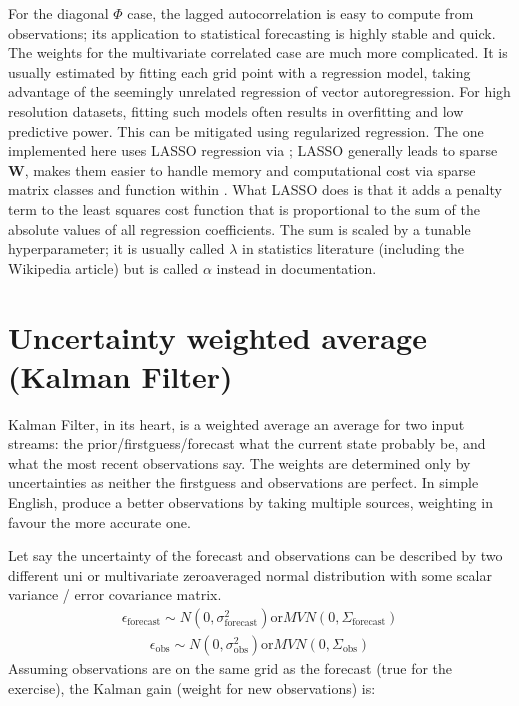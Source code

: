 \documentclass[letterpaper,10pt,english]{sphinxmanual}
\begin{document}
\sphinxAtStartPar
For the diagonal \(\Phi\) case, the lagged autocorrelation is easy to compute from observations; its application
to statistical forecasting is highly stable and quick. The weights for the multi\sphinxhyphen{}variate correlated case are
much more complicated. It is usually estimated by fitting each grid point with a regression model, taking advantage of
the seemingly unrelated regression of vector autoregression. For high resolution
datasets, fitting such models often results in overfitting and low predictive power. This can be mitigated using
regularized regression. The one implemented here uses LASSO regression  via ;
LASSO generally leads to sparse \(\mathbf{W}\), makes them easier to handle memory and computational cost via
sparse matrix classes and function within . What LASSO does is that it adds a penalty term to the least squares cost
function that is proportional to the sum of the absolute values of all regression coefficients. The
sum is scaled by a tunable hyperparameter; it is usually called \(\lambda\) in statistics literature (including the Wikipedia
article) but is called \(\alpha\) instead in  documentation.


\section{Uncertainty weighted average (Kalman Filter)}
\label{\detokenize{kalman:uncertainty-weighted-average-kalman-filter}}
\sphinxAtStartPar
Kalman Filter, in its heart, is a weighted average \textendash{} an average for two input streams: the
prior/first\sphinxhyphen{}guess/forecast what the current state probably be, and what the most recent observations
say. The weights are determined only by uncertainties as neither the first\sphinxhyphen{}guess and observations
are perfect. In simple English, produce a better observations by taking multiple sources, weighting
in favour the more accurate one.

\sphinxAtStartPar
Let say the uncertainty of the forecast and observations can be described by two different uni\sphinxhyphen{} or
multi\sphinxhyphen{}variate zero\sphinxhyphen{}averaged normal distribution with some scalar variance / error covariance matrix.
\begin{equation*}
\begin{split}\epsilon_{\text{forecast}} \sim N(0, \sigma_{\text{forecast}}^2) \text{or} MVN(0,
\Sigma_{\text{forecast}})\end{split}
\end{equation*}\begin{equation*}
\begin{split}\epsilon_{\text{obs}} \sim N(0, \sigma_{\text{obs}}^2) \text{or} MVN(0, \Sigma_{\text{obs}})\end{split}
\end{equation*}
\sphinxAtStartPar
Assuming observations are on the same grid as the forecast (true for the exercise), the Kalman gain
(weight for new observations) is:
\end{document}
